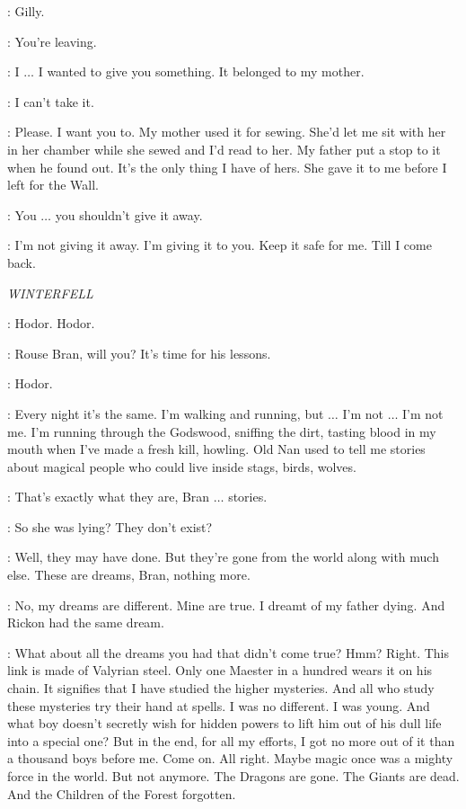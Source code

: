 \SAM: Gilly. 

\GILLY: You're leaving. 

\SAM: I $\ldots$ I wanted to give you something. It belonged to my mother. 


\GILLY: I can't take it. 

\SAM: Please. I want you to. My mother used it for sewing. She'd let me sit with her in her chamber while she sewed and I'd read to her. My father put a stop to it when he found out. It's the only thing I have of hers. She gave it to me before I left for the Wall. 

\GILLY: You $\ldots$ you shouldn't give it away. 

\SAM: I'm not giving it away. I'm giving it to you. Keep it safe for me. Till I come back. 



\scene

\textit{WINTERFELL} 


\HODOR: Hodor. Hodor. 

\LUWIN: Rouse Bran, will you? It's time for his lessons. 


\HODOR: Hodor. 


\BRAN: Every night it's the same. I'm walking and running, but $\ldots$ I'm not $\ldots$ I'm not me. I'm running through the Godswood, sniffing the dirt, tasting blood in my mouth when I've made a fresh kill, howling. Old Nan used to tell me stories about magical people who could live inside stags, birds, wolves. 

\LUWIN: That's exactly what they are, Bran $\ldots$ stories. 

\BRAN: So she was lying? They don't exist? 

\LUWIN: Well, they may have done. But they're gone from the world along with much else. These are dreams, Bran, nothing more. 

\BRAN: No, my dreams are different. Mine are true. I dreamt of my father dying. And Rickon had the same dream. 

\LUWIN: What about all the dreams you had that didn't come true? Hmm?  Right. This link is made of Valyrian steel. Only one Maester in a hundred wears it on his chain. It signifies that I have studied the higher mysteries. And all who study these mysteries try their hand at spells. I was no different. I was young. And what boy doesn't secretly wish for hidden powers to lift him out of his dull life into a special one? But in the end, for all my efforts, I got no more out of it than a thousand boys before me. Come on.  All right. Maybe magic once was a mighty force in the world. But not anymore. The Dragons are gone. The Giants are dead. And the Children of the Forest forgotten. 


